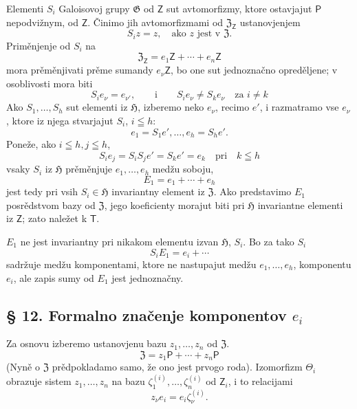 \documentclass[11pt]{article}
\begin{document}
Elementi \(S_i\) Galoisovoj grupy \(\mathfrak G\) od \(\mathsf Z\) sut avtomorfizmy, ktore ostavjajut \(\mathsf P\) nepodvižnym, od \(\mathsf Z\). Činimo jih avtomorfizmami od \(\mathfrak Z_{\mathsf Z}\) ustanovjenjem
\[
S_i z=z,\quad \text{ako } z \text{ jest v } \mathfrak Z.
\]
Priměnjenje od \(S_i\) na
\[
\mathfrak Z_{\mathsf Z}=e_1\mathsf Z+\cdots+e_n\mathsf Z
\]
mora prěměnjivati prěme sumandy \(e_\nu\mathsf Z\), bo one sut jednoznačno opreděljene; v osoblivosti mora biti
\[
S_i e_\nu=e_{\nu'},\qquad\text{i}\qquad S_i e_\nu\ne S_k e_\nu
\quad\text{za } i\ne k
\]
Ako \(S_1,\ldots,S_h\) sut elementi iz \(\mathfrak H\), izberemo neko \(e_\nu\), recimo \(e'\), i razmatramo vse \(e_\nu\), ktore iz njega stvarjajut \(S_i\), \(i\leqq h\):
\[
e_1=S_1e',\ldots,e_h=S_he'.
\]
Poneže, ako \(i\leqq h, j\leqq h\),
\[
S_i e_j=S_iS_j e'=S_ke'=e_k \quad \text{pri}\quad k\leqq h
\]
vsaky \(S_i\) iz \(\mathfrak H\) prěměnjuje \(e_1,\ldots,e_h\) medžu soboju,
\[
E_1=e_1+\cdots+e_h
\]
jest tedy pri vsih \(S_i\in\mathfrak H\) invariantny element iz \(\mathfrak Z\). Ako predstavimo \(E_1\) posrědstvom bazy od \(\mathfrak Z\), jego koeficienty morajut biti pri \(\mathfrak H\) invariantne elementi iz \(\mathsf Z\); zato naležet k \(\mathsf T\).

\(E_1\) ne jest invariantny pri nikakom elementu izvan \(\mathfrak H\), \(S_i\). Bo za tako \(S_i\)
\[
S_i E_1=e_i+\cdots
\]
sadržuje medžu komponentami, ktore ne nastupajut medžu \(e_1,\ldots,e_h\), komponentu \(e_i\), ale zapis sumy od \(E_1\) jest jednoznačny.

\subsection*{§ 12. Formalno značenje komponentov \(e_i\)}\label{die-formale-bedeutung-der-komponenten-ei}

Za osnovu izberemo ustanovjenu bazu \(z_1,\ldots,z_n\) od \(\mathfrak Z\).
\[
\mathfrak Z=z_1\mathsf P+\cdots+z_n\mathsf P
\]
(Nyně o \(\mathfrak Z\) prědpokladamo samo, že ono jest prvogo roda). Izomorfizm \(\Theta_i\) obrazuje sistem \(z_1,\ldots,z_n\) na bazu \(\zeta_1^{(i)},\ldots,\zeta_n^{(i)}\) od \(\mathsf Z_i\), i to relacijami
\[
z_\nu e_i=e_i\zeta_\nu^{(i)} .
\]
\end{document}
